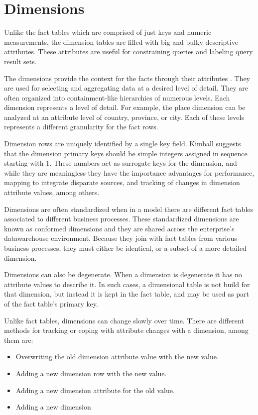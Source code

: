 \documentclass[]{article}
\begin{document}


\section{Dimensions} %
\label{sec:dimensions}

Unlike the fact tables which are comprised of just keys and numeric measurements, the dimension tables are filled with big and bulky
descriptive attributes. These attributes are useful for constraining queries and labeling query result sets.

The dimensions provide the context for the facts through their attributes . They are used for selecting and aggregating data at a
desired level of detail. They are often organized into containment-like hierarchies of numerous levels. Each dimension represents a
level of detail. For example, the place dimension can be analyzed at an attribute level of country, province, or city. Each of these
levels represents a different granularity for the fact rows.

Dimension rows are uniquely identified by a single key field. Kimball suggests that the dimension primary keys should be simple integers
assigned in sequence starting with 1. These numbers act as surrogate keys for the dimension, and while they are meaningless they have
the importance advantages for performance, mapping to integrate disparate sources, and tracking of changes in dimension attribute
values, among others.

Dimensions are often standardized when in a model there are different fact tables associated to different business processes. These
standardized dimensions are known as conformed dimensions and they are shared across the enterprise's datawarehouse environment. Because
they join with fact tables from various business processes, they must either be identical, or a subset of a more detailed dimension.

Dimensions can also be degenerate. When a dimension is degenerate it has no attribute values to describe it. In such cases, a
dimensional table is not build for that dimension, but instead it is kept in the fact table, and may be used as part of the fact table's
primary key.

Unlike fact tables, dimensions can change slowly over time. There are different methods for tracking or coping with attribute changes with a dimension, among them are:
\begin{itemize}
	\item Overwriting the old dimension attribute value with the new value.
	\item Adding a new dimension row with the new value.
	\item Adding a new dimension attribute for the old value.
	\item Adding a new dimension
\end{itemize}
\end{document}
